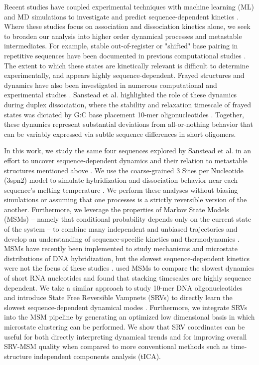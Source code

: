 \documentclass[journal=jpcbfk,manuscript=article]{achemso}
\begin{document}
Recent studies have coupled experimental techniques with machine learning (ML) and  MD simulations to investigate and predict sequence-dependent kinetics \citep{Schickinger2018TetheredHelices, Zhang2018PredictingSequence}. Where these studies focus on association and dissociation kinetics alone, we seek to broaden our analysis into higher order dynamical processes and metastable intermediates. For example, stable out-of-register or "shifted" base pairing in repetitive sequences have been documented in previous computational studies \citep{Phys2014, Maciejczyk2014DNAModel, Araque2016LatticeCooperativity, Xiao2019}. The extent to which these states are kinetically relevant is difficult to determine experimentally, and appears highly sequence-dependent. Frayed structures and dynamics have also been investigated in numerous computational and experimental studies \citep{Zgarbova2014BaseRNA, Nonin1995TerminalFraying, Nikolova2012ProbingSimulations, Andreatta2006UltrafastHelix}. Sanstead et al. highlighted the role of these dynamics during duplex dissociation, where the stability and relaxation timescale of frayed states was dictated by G:C base placement 10-mer oligonucleotides \citep{Sanstead2016}. Together, these dynamics represent substantial deviations from all-or-nothing behavior that can be variably expressed via subtle sequence differences in short oligomers.

In this work, we study the same four sequences explored by Sanstead et al. in an effort to uncover sequence-dependent dynamics and their relation to metastable structures mentioned above \citep{Sanstead2016}. We use the coarse-grained 3 Sites per Nucleotide (3spn2) model to simulate hybridization and dissociation behavior near each sequence's melting temperature \citep{Hinckley2013AnHybridization}. We perform these analyses without biasing simulations or assuming that one processes is a strictly reversible version of the another. Furthermore, we leverage the properties of Markov State Models (MSMs) -- namely that conditional probability depends only on the current state of the system  -- to combine many independent and unbiased trajectories and develop an understanding of sequence-specific kinetics and thermodynamics \citep{Pande2010EverythingAsk}. MSMs have recently been implemented to study mechanisms and microstate distributions of DNA hybridization, but the slowest sequence-dependent kinetics were not the focus of these studies \citep{Jin2019, Xiao2019}. \citet{Pinamonti2017} used MSMs to compare the slowest dynamics of short RNA nucleotides and found that stacking timescales are highly sequence dependent. We take a similar approach to study 10-mer DNA oligonucleotides and introduce State Free Reversible Vampnets (SRVs) to directly learn the slowest sequence-dependent dynamical modes \citep{Chen}. Furthermore, we integrate SRVs into the MSM pipeline by generating an optimized low dimensional basis in which microstate clustering can be performed. We show that SRV coordinates can be useful for both directly interpreting dynamical trends and for improving overall SRV-MSM quality when compared to more conventional methods such as time-structure independent components analysis (tICA).
\end{document}
